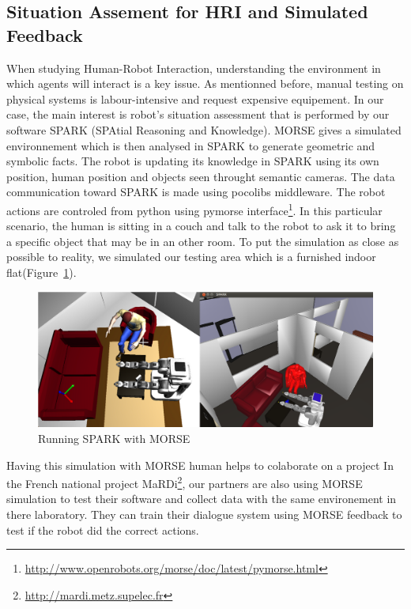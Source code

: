 \documentclass[conference]{IEEEtran}
\begin{document}
\subsection{Situation Assement for HRI and Simulated Feedback}
\label{scenario4}

When studying Human-Robot Interaction, understanding the environment in which
agents will interact is a key issue. As mentionned before, manual testing on
physical systems is labour-intensive and request expensive equipement.
In our case, the main interest is robot's situation assessment that is performed 
by our software SPARK (SPAtial Reasoning and Knowledge). MORSE gives a simulated 
environnement which is then analysed in SPARK to generate geometric and symbolic
 facts. The robot is updating its knowledge in SPARK using its own position,
human position and objects seen throught semantic cameras. The data communication 
toward SPARK is made using pocolibs middleware. The robot actions are controled 
from python using pymorse
interface\footnote{\url{http://www.openrobots.org/morse/doc/latest/pymorse.html}}.
In this particular scenario, the human is sitting in a couch and talk to the
robot to ask it to bring a specific object that may be in an other room.
To put the simulation as close as possible to reality, we simulated our testing
area which is a furnished indoor flat(Figure~\ref{fig|spark}).

\begin{figure}[H]
      \centering
      \includegraphics[width=0.9\linewidth]{morsespark.png}
      \caption{Running SPARK with MORSE}
      \label{fig|spark}
\end{figure}

Having this simulation with MORSE human helps to colaborate on a project
In the French national project MaRDi\footnote{\url{http://mardi.metz.supelec.fr}},
our partners are also using MORSE simulation to test their software and collect 
data with the same environement in there laboratory.
They can train their dialogue system using MORSE feedback to test if the robot
did the correct actions.
\end{document}
